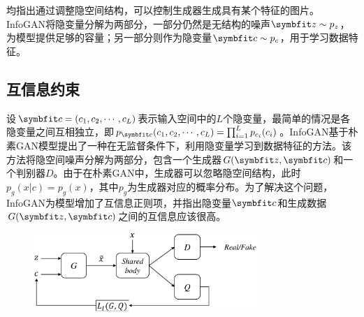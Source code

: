 \citet{mirza2014conditional,odena2017conditional,miyato2018cgans}均指出通过调整隐空间结构，可以控制生成器生成具有某个特征的图片。InfoGAN\citep{chen2016infogan}将隐变量分解为两部分，一部分仍然是无结构的噪声$\bd{z} \sim p_z$，为模型提供足够的容量；另一部分则作为隐变量$\bd{c} \sim p_c$，用于学习数据特征。

\subsection{互信息约束}
设$\bd{c} = (c_1, c_2, \cdots, c_L)$表示输入空间中的$L$个隐变量，最简单的情况是各隐变量之间互相独立，即$p_{\bd{c}}(c_1, c_2, \cdots, c_L) = \prod_{i=1}^L p_{c_i}(c_i)$。InfoGAN基于朴素GAN模型提出了一种在无监督条件下，利用隐变量学习到数据特征的方法。该方法将隐空间噪声分解为两部分，包含一个生成器$G(\bd{z}, \bd{c})$和一个判别器$D$。由于在朴素GAN中，生成器可以忽略隐空间结构，此时$p_g(x|c) = p_g(x)$，其中$p_g$为生成器对应的概率分布。为了解决这个问题，InfoGAN为模型增加了互信息正则项，并指出隐变量$\bd{c}$和生成数据$G(\bd{z}, \bd{c})$之间的互信息应该很高。
\begin{figure}[hbtp]
  \centering
  \includegraphics[width=0.75\textwidth]{Img/arch-infogan.pdf}
  \label{fig:arch-infogan}
\end{figure}

